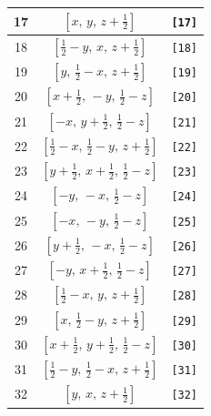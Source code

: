 \documentclass[fleqn,8pt]{jsarticle}
\begin{document}
\begin{longtable}{ccc}
17 & $\left[ x,\, y,\, z + \frac{1}{2} \right]$ & {\tt [17]} \\ \hline
18 & $\left[ \frac{1}{2} - y,\, x,\, z + \frac{1}{2} \right]$ & {\tt [18]} \\ \hline
19 & $\left[ y,\, \frac{1}{2} - x,\, z + \frac{1}{2} \right]$ & {\tt [19]} \\ \hline
20 & $\left[ x + \frac{1}{2},\, - y,\, \frac{1}{2} - z \right]$ & {\tt [20]} \\ \hline
21 & $\left[ - x,\, y + \frac{1}{2},\, \frac{1}{2} - z \right]$ & {\tt [21]} \\ \hline
22 & $\left[ \frac{1}{2} - x,\, \frac{1}{2} - y,\, z + \frac{1}{2} \right]$ & {\tt [22]} \\ \hline
23 & $\left[ y + \frac{1}{2},\, x + \frac{1}{2},\, \frac{1}{2} - z \right]$ & {\tt [23]} \\ \hline
24 & $\left[ - y,\, - x,\, \frac{1}{2} - z \right]$ & {\tt [24]} \\ \hline
25 & $\left[ - x,\, - y,\, \frac{1}{2} - z \right]$ & {\tt [25]} \\ \hline
26 & $\left[ y + \frac{1}{2},\, - x,\, \frac{1}{2} - z \right]$ & {\tt [26]} \\ \hline
27 & $\left[ - y,\, x + \frac{1}{2},\, \frac{1}{2} - z \right]$ & {\tt [27]} \\ \hline
28 & $\left[ \frac{1}{2} - x,\, y,\, z + \frac{1}{2} \right]$ & {\tt [28]} \\ \hline
29 & $\left[ x,\, \frac{1}{2} - y,\, z + \frac{1}{2} \right]$ & {\tt [29]} \\ \hline
30 & $\left[ x + \frac{1}{2},\, y + \frac{1}{2},\, \frac{1}{2} - z \right]$ & {\tt [30]} \\ \hline
31 & $\left[ \frac{1}{2} - y,\, \frac{1}{2} - x,\, z + \frac{1}{2} \right]$ & {\tt [31]} \\ \hline
32 & $\left[ y,\, x,\, z + \frac{1}{2} \right]$ & {\tt [32]} \\
\end{longtable}
\end{document}
